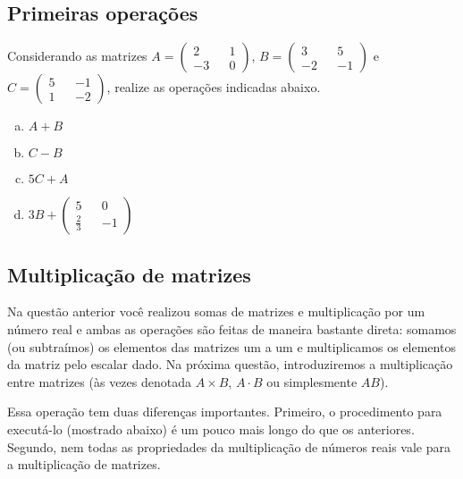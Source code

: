 \documentclass[main_estudante.tex]{subfiles}
\begin{document}
\subsection*{Primeiras operações}

\begin{questao}
Considerando as matrizes $A=\begin{pmatrix} 2 && 1 \\ -3 && 0 \end{pmatrix}$, $B=\begin{pmatrix} 3 && 5 \\ -2 && -1 \end{pmatrix}$ e $C=\begin{pmatrix} 5 && -1 \\ 1 && -2 \end{pmatrix}$, realize as operações indicadas abaixo.
\begin{enumerate}[a)]
\item $A+B$
\item $C-B$
\item $5C+A$
\item $3B+\begin{pmatrix} 5 && 0 \\ \frac{2}{3} && -1 \end{pmatrix}$
\end{enumerate}

\end{questao}

\subsection*{Multiplicação de matrizes}

Na questão anterior você realizou somas de matrizes e multiplicação por um número real e ambas as operações são feitas de maneira bastante direta: somamos (ou subtraímos) os elementos das matrizes um a um e multiplicamos os elementos da matriz pelo escalar dado. Na próxima questão, introduziremos a multiplicação entre matrizes (às vezes denotada $A \times B$, $A \cdot B$ ou simplesmente $AB$).

Essa operação tem duas diferenças importantes. Primeiro, o procedimento para executá-lo (mostrado abaixo) é um pouco mais longo do que os anteriores. Segundo, nem todas as propriedades da multiplicação de números reais vale para a multiplicação de matrizes.
\end{document}
